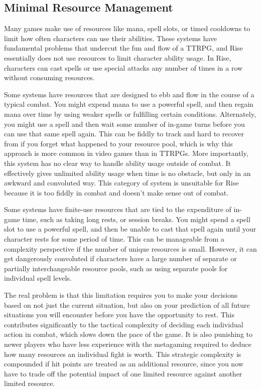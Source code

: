   \subsection{Minimal Resource Management}
    Many games make use of resources like mana, spell slots, or timed cooldowns to limit how often characters can use their abilities.
    These systems have fundamental problems that undercut the fun and flow of a TTRPG, and Rise essentially does not use resources to limit character ability usage.
    In Rise, characters can cast spells or use special attacks any number of times in a row without consuming resources.

    Some systems have resources that are designed to ebb and flow in the course of a typical combat.
    You might expend mana to use a powerful spell, and then regain mana over time by using weaker spells or fulfilling certain conditions.
    Alternately, you might use a spell and then wait some number of in-game turns before you can use that same spell again.
    This can be fiddly to track and hard to recover from if you forget what happened to your resource pool, which is why this approach is more common in video games than in TTRPGs.
    More importantly, this system has no clear way to handle ability usage outside of combat.
    It effectively gives unlimited ability usage when time is no obstacle, but only in an awkward and convoluted way.
    This category of system is unsuitable for Rise because it is too fiddly in combat and doesn't make sense out of combat.

    Some systems have finite-use resources that are tied to the expenditure of in-game time, such as taking long rests, or session breaks.
    You might spend a spell slot to use a powerful spell, and then be unable to cast that spell again until your character rests for some period of time.
    This can be manageable from a complexity perspective if the number of unique resources is small.
    However, it can get dangerously convoluted if characters have a large number of separate or partially interchangeable resource pools, such as using separate pools for individual spell levels.

    The real problem is that this limitation requires you to make your decisions based on not just the current situation, but also on your prediction of all future situations you will encounter before you have the opportunity to rest.
    This contributes significantly to the tactical complexity of deciding each individual action in combat, which slows down the pace of the game.
    It is also punishing to newer players who have less experience with the metagaming required to deduce how many resources an individual fight is worth.
    This strategic complexity is compounded if hit points are treated as an additional resource, since you now have to trade off the potential impact of one limited resource against another limited resource.

